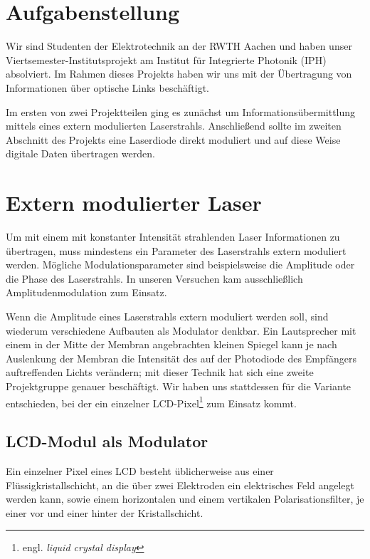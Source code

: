 \documentclass[12pt,a4paper]{article}
\begin{document}

\tableofcontents
\newpage

\section{Aufgabenstellung}
Wir sind Studenten der Elektrotechnik an der RWTH Aachen und haben unser Viertsemester-Institutsprojekt am Institut für Integrierte Photonik (IPH) absolviert. Im Rahmen dieses Projekts haben wir uns mit der Übertragung von Informationen über optische Links beschäftigt.

Im ersten von zwei Projektteilen ging es zunächst um Informationsübermittlung mittels eines extern modulierten Laserstrahls. Anschließend sollte im zweiten Abschnitt des Projekts eine Laserdiode direkt moduliert und auf diese Weise digitale Daten übertragen werden.


\section{Extern modulierter Laser}
Um mit einem mit konstanter Intensität strahlenden Laser Informationen zu übertragen, muss mindestens ein Parameter des Laserstrahls extern moduliert werden. Mögliche Modulationsparameter sind beispielsweise die Amplitude oder die Phase des Laserstrahls. In unseren Versuchen kam ausschließlich Amplitudenmodulation zum Einsatz.

Wenn die Amplitude eines Laserstrahls extern moduliert werden soll, sind wiederum verschiedene Aufbauten als Modulator denkbar. Ein Lautsprecher mit einem in der Mitte der Membran angebrachten kleinen Spiegel kann je nach Auslenkung der Membran die Intensität des auf der Photodiode des Empfängers auftreffenden Lichts verändern; mit dieser Technik hat sich eine zweite Projektgruppe genauer beschäftigt. Wir haben uns stattdessen für die Variante entschieden, bei der ein einzelner LCD-Pixel\footnote{engl. \textit{liquid crystal display}} zum Einsatz kommt.

\subsection{LCD-Modul als Modulator}
Ein einzelner Pixel eines LCD besteht üblicherweise aus einer Flüssigkristallschicht, an die über zwei Elektroden ein elektrisches Feld angelegt werden kann, sowie einem horizontalen und einem vertikalen Polarisationsfilter, je einer vor und einer hinter der Kristallschicht.
\end{document}
